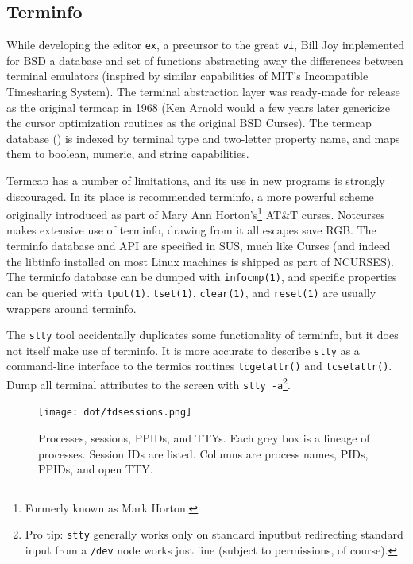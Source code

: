 \subsection{Terminfo}
\label{sec:terminfo}
While developing the editor \texttt{ex}, a precursor to the great \texttt{vi},
Bill Joy implemented for BSD a database and set of functions abstracting away
the differences between terminal emulators (inspired by similar capabilities of
MIT's Incompatible Timesharing System\cite{itspdp}).
The terminal abstraction layer was ready-made for release as the original termcap
in 1968 (Ken Arnold would a few years later genericize the cursor optimization
routines as the original BSD Curses\cite{arnold1977}). The termcap database
() is indexed by terminal type and two-letter property name,
and maps them to boolean, numeric, and string capabilities.

Termcap has a number of limitations, and its use in new programs is strongly
discouraged. In its place is recommended terminfo, a more powerful scheme
originally introduced as part of Mary Ann Horton's\footnote{Formerly known as Mark
Horton.} AT\&T curses\cite{horton1982}. Notcurses makes extensive use of terminfo,
drawing from it all escapes save RGB. The terminfo database and API are
specified in SUS, much like Curses (and indeed the libtinfo installed on most
Linux machines is shipped as part of NCURSES). The terminfo database can be
dumped with \texttt{infocmp(1)}, and specific properties can be queried with
\texttt{tput(1)}. \texttt{tset(1)}, \texttt{clear(1)}, and \texttt{reset(1)}
are usually wrappers around terminfo.

The \texttt{stty} tool accidentally duplicates some functionality of terminfo,
but it does not itself make use of terminfo. It is more accurate to describe
\texttt{stty} as a command-line interface to the termios routines
\texttt{tcgetattr()} and \texttt{tcsetattr()}. Dump all terminal attributes to
the screen with \texttt{stty -a}\footnote{Pro tip: \texttt{stty} generally works
  only on standard input\textellipsis but redirecting standard input from a
  \texttt{/dev} node works just fine (subject to permissions, of course).}.

\begin{figure}[!htb]
  \centering
  \texttt{[image: dot/fdsessions.png]}
  \caption[Processes, sessions, PPIDs, and TTYs.]
  {Processes, sessions, PPIDs, and TTYs. Each grey box is a lineage of processes.
  Session IDs are listed. Columns are process names, PIDs, PPIDs, and open TTY.}
  \label{fig:fdsessions}
\end{figure}
